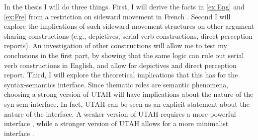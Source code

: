 \documentclass[letterpaper]{article}
\begin{document}
In the thesis I will do three things.
First, I will derive the facts in \ref{ex:Eng} and \ref{ex:Fre} from a restriction on sideward movement in French \parencite[cf.][]{kratzer_building_2004}.
Second I will explore the implications of such sideward movement structures on other argument sharing constructions (e.g., depictives, serial verb constructions, direct perception reports).
An investigation of other constructions will allow me to test my conclusions in the first part, by showing that the same logic can rule out serial verb constructions in English, and allow for depictives and direct perception report.
Third, I will explore the theoretical implications that this has for the syntax-semantics interface.
Since thematic roles are semantic phenomena, choosing a strong version of UTAH will have implications about the nature of the syn-sem interface.
In fact, UTAH can be seen as an explicit statement about the nature of the interface.
A weaker version of UTAH requires a more powerful interface \parencite[and followers]{heimkratzer1998semantics}, while a stronger version of UTAH allows for a more minimalist interface \parencite{pietroski2005events,pietroski2011minimal}.


\printbibliography
\end{document}
